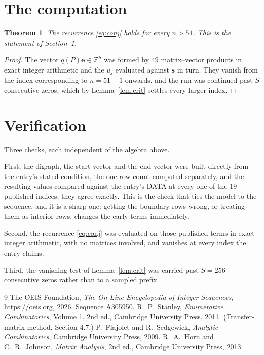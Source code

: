 \documentclass[11pt,a4paper]{article}
\theoremstyle{plain}
\newtheorem{theorem}{Theorem}
\theoremstyle{definition}
\begin{document}
\section{The computation}

\begin{theorem}
The recurrence \eqref{eq:conj} holds for every $n>51$. This is the statement of
Section~1.
\end{theorem}

\begin{proof}
The vector $q(P)\mathbf{e}\in\mathbb{Z}^{S}$ was formed by $49$ matrix--vector
products in exact integer arithmetic and the $u_j$ evaluated against $\mathbf{s}$ in turn.
They vanish from the index corresponding to $n=51+1$ onwards, and the run was continued
past $S$ consecutive zeros, which by Lemma~\ref{lem:crit} settles every larger index.
\end{proof}

\section{Verification}

Three checks, each independent of the algebra above.

First, the digraph, the start vector and the end vector were built directly from the
entry's stated condition, the one-row count computed separately, and the resulting values
compared against the entry's DATA at every one of the $19$ published indices; they
agree exactly. This is the check that ties the model to the sequence, and it is a sharp one:
getting the boundary rows wrong, or treating them as interior rows, changes the early terms
immediately.

Second, the recurrence \eqref{eq:conj} was evaluated on those published terms in exact
integer arithmetic, with no matrices involved, and vanishes at every index the entry claims.

Third, the vanishing test of Lemma~\ref{lem:crit} was carried past $S=256$ consecutive
zeros rather than to a sampled prefix.

\begin{thebibliography}{9}
 The OEIS Foundation, \emph{The On-Line Encyclopedia of Integer
Sequences}, \url{https://oeis.org}, 2026. Sequence A305950.
 R.~P.~Stanley, \emph{Enumerative Combinatorics}, Volume 1, 2nd ed.,
Cambridge University Press, 2011. (Transfer-matrix method, Section 4.7.)
 P.~Flajolet and R.~Sedgewick, \emph{Analytic Combinatorics}, Cambridge
University Press, 2009.
 R.~A.~Horn and C.~R.~Johnson, \emph{Matrix Analysis}, 2nd ed., Cambridge
University Press, 2013.
\end{thebibliography}
\end{document}
